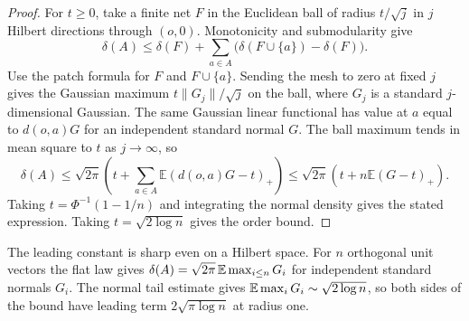 \begin{proof}
For $t\ge0$, take a finite net $F$ in the Euclidean ball of radius
$t/\sqrt j$ in $j$ Hilbert directions through $(o,0)$. Monotonicity
and submodularity give
\[
 \delta(A)\leq\delta(F)+
        \sum_{a\in A}\bigl(\delta(F\cup\{a\})-\delta(F)\bigr).
\]
Use the patch formula for $F$ and $F\cup\{a\}$. Sending the mesh to
zero at fixed $j$ gives the Gaussian maximum $t\|G_j\|/\sqrt j$ on
the ball, where $G_j$ is a standard $j$-dimensional Gaussian. The same Gaussian linear functional has
value at $a$ equal to $d(o,a)G$ for an independent standard normal $G$.
The ball maximum tends in mean square to $t$ as $j\to\infty$, so
\[
 \delta(A)\leq\sqrt{2\pi}\left(t+
          \sum_{a\in A}\mathbb E(d(o,a)G-t)_+\right)
       \leq\sqrt{2\pi}\left(t+n\mathbb E(G-t)_+\right).
\]
Taking $t=\Phi^{-1}(1-1/n)$ and integrating the normal density gives
the stated expression. Taking $t=\sqrt{2\log n}$ gives the order bound.
\end{proof}

The leading constant is sharp even on a Hilbert space. For $n$
orthogonal unit vectors the flat law gives
$\delta(A)=\sqrt{2\pi}\,\mathbb E\max_{i\le n}G_i$ for independent standard
normals $G_i$. The normal tail estimate gives
$\mathbb E\max_iG_i\sim\sqrt{2\log n}$, so both sides of the bound have
leading term $2\sqrt{\pi\log n}$ at radius one.
